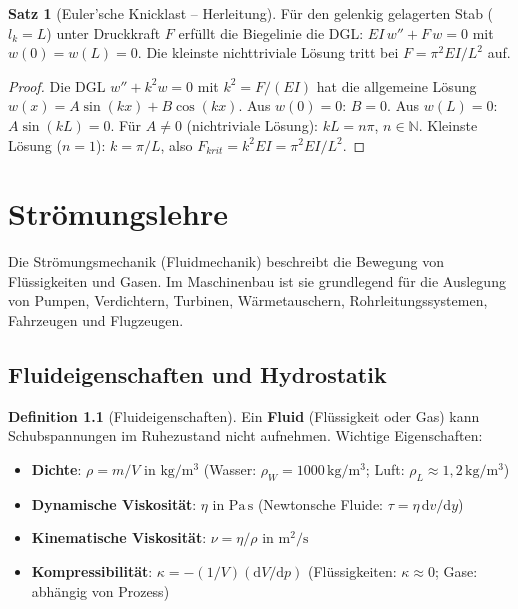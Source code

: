 ﻿\documentclass[a4paper,12pt]{report}
\theoremstyle{definition}
\newtheorem{definition}{Definition}
\newtheorem{satz}{Satz}
\begin{document}
\begin{satz}[Euler'sche Knicklast -- Herleitung]
F\"ur den gelenkig gelagerten Stab ($l_k = L$) unter Druckkraft $F$
erf\"ullt die Biegelinie die DGL:
$EI\,w'' + F\,w = 0$ mit $w(0) = w(L) = 0$.
Die kleinste nichttriviale L\"osung tritt bei $F = \pi^2 EI/L^2$ auf.
\end{satz}
\begin{proof}
Die DGL $w'' + k^2 w = 0$ mit $k^2 = F/(EI)$ hat die allgemeine L\"osung
$w(x) = A\sin(kx) + B\cos(kx)$.
Aus $w(0) = 0$: $B = 0$. Aus $w(L) = 0$: $A\sin(kL) = 0$.
F\"ur $A \neq 0$ (nichtriviale L\"osung): $kL = n\pi$, $n \in \mathbb{N}$.
Kleinste L\"osung ($n=1$): $k = \pi/L$, also $F_{krit} = k^2 EI = \pi^2 EI/L^2$.
\end{proof}

\chapter{Str\"omungslehre}

Die Str\"omungsmechanik (Fluidmechanik) beschreibt die Bewegung von
Fl\"ussigkeiten und Gasen. Im Maschinenbau ist sie grundlegend f\"ur
die Auslegung von Pumpen, Verdichtern, Turbinen, W\"armetauschern,
Rohrleitungssystemen, Fahrzeugen und Flugzeugen.

\section{Fluideigenschaften und Hydrostatik}

\begin{definition}[Fluideigenschaften]
Ein \textbf{Fluid} (Fl\"ussigkeit oder Gas) kann Schubspannungen im
Ruhezustand nicht aufnehmen. Wichtige Eigenschaften:
\begin{itemize}
    \item[-] \textbf{Dichte}: $\rho = m/V$ in $\mathrm{kg/m^3}$
          (Wasser: $\rho_W = 1000\,\mathrm{kg/m^3}$; Luft: $\rho_L \approx 1{,}2\,\mathrm{kg/m^3}$)
    \item[-] \textbf{Dynamische Viskosit\"at}: $\eta$ in $\mathrm{Pa\,s}$
          (Newtonsche Fluide: $\tau = \eta\,\mathrm{d}v/\mathrm{d}y$)
    \item[-] \textbf{Kinematische Viskosit\"at}: $\nu = \eta/\rho$ in $\mathrm{m^2/s}$
    \item[-] \textbf{Kompressibilit\"at}: $\kappa = -(1/V)(\mathrm{d}V/\mathrm{d}p)$
          (Fl\"ussigkeiten: $\kappa \approx 0$; Gase: abh\"angig von Prozess)
\end{itemize}
\end{definition}
\end{document}
